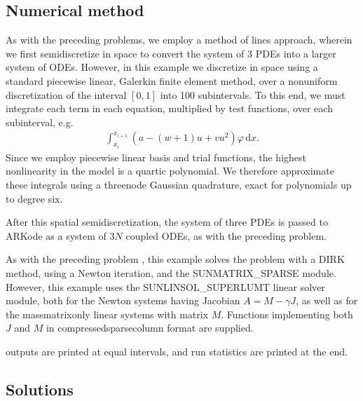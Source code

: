 \documentclass[letterpaper,10pt,english]{sphinxmanual}
\begin{document}
\subsection{Numerical method}
\label{\detokenize{c_serial:id23}}
\sphinxAtStartPar
As with the preceding problems, we employ a method of lines approach,
wherein we first semi\sphinxhyphen{}discretize in space to convert the system of 3
PDEs into a larger system of ODEs.  However, in this example we
discretize in space using a standard piecewise linear, Galerkin finite
element method, over a non\sphinxhyphen{}uniform discretization of the interval
\([0,1]\) into 100 subintervals.  To this end, we must integrate
each term in each equation, multiplied by test functions, over each
subinterval, e.g.
\begin{equation*}
\begin{split}\int_{x_i}^{x_{i+1}} \left(a - (w+1) u + v u^2\right) \varphi\,\mathrm dx.\end{split}
\end{equation*}
\sphinxAtStartPar
Since we employ piecewise linear basis and trial functions, the
highest nonlinearity in the model is a quartic polynomial.  We
therefore approximate these integrals using a three\sphinxhyphen{}node Gaussian
quadrature, exact for polynomials up to degree six.

\sphinxAtStartPar
After this spatial semi\sphinxhyphen{}discretization, the system of three PDEs is
passed to ARKode as a system of \(3N\) coupled ODEs, as with the
preceding problem.

\sphinxAtStartPar
As with the preceding problem {\hyperref[\detokenize{c_serial:ark-brusselator1d-klu}]{}}, this
example solves the problem with a DIRK method, using a Newton
iteration, and the SUNMATRIX\_SPARSE module.  However, this example
uses the SUNLINSOL\_SUPERLUMT linear solver module, both for the Newton
systems having Jacobian \(A=M-\gamma J\), as well as for the
mass\sphinxhyphen{}matrix\sphinxhyphen{}only linear systems with matrix \(M\).  Functions
implementing both \(J\) and \(M\) in compressed\sphinxhyphen{}sparse\sphinxhyphen{}column
format are supplied.

 outputs are printed at equal intervals, and run statistics
are printed at the end.


\subsection{Solutions}
\label{\detokenize{c_serial:id24}}
\noindent{}
\end{document}
